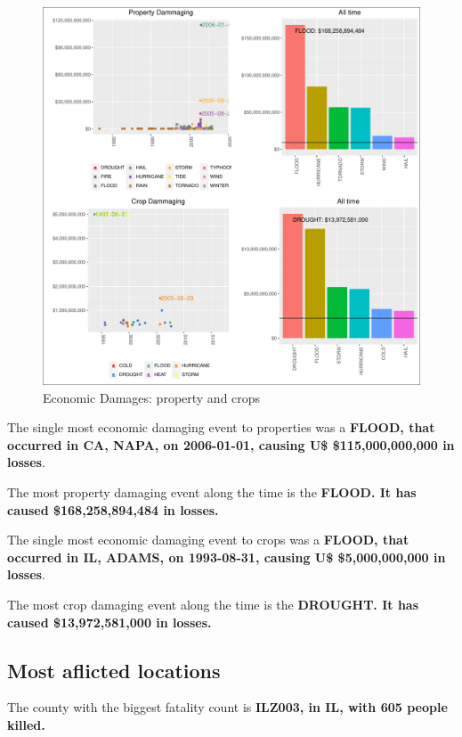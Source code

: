 \suppressfloats\begin{figure}[htbp]
\centering
\includegraphics{readme_files/figure-latex/economic-plot-1.pdf}
\caption{Economic Damages: property and crops}
\end{figure}

The single most economic damaging event to properties was a
\textbf{FLOOD, that occurred in CA, NAPA, on 2006-01-01, causing U\$
\$115,000,000,000 in losses}.

The most property damaging event along the time is the \textbf{FLOOD. It
has caused \$168,258,894,484 in losses.}

The single most economic damaging event to crops was a \textbf{FLOOD,
that occurred in IL, ADAMS, on 1993-08-31, causing U\$ \$5,000,000,000
in losses}.

The most crop damaging event along the time is the \textbf{DROUGHT. It
has caused \$13,972,581,000 in losses.}

\subsection{Most aflicted locations}\label{most-aflicted-locations-1}

The county with the biggest fatality count is \textbf{ILZ003, in IL,
with 605 people killed.}

